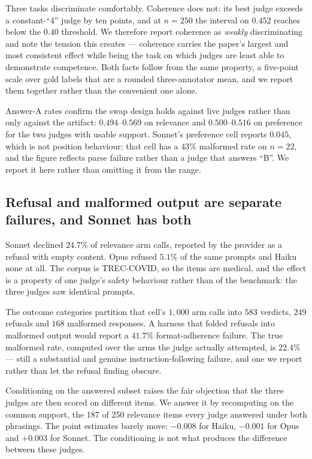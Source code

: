 \documentclass[11pt]{article}          %
\begin{document}
Three tasks discriminate comfortably. Coherence does not: its best judge exceeds
a constant-``4'' judge by ten points, and at $n=250$ the interval on $0.452$
reaches below the $0.40$ threshold. We therefore report coherence as
\emph{weakly} discriminating and note the tension this creates --- coherence
carries the paper's largest and most consistent effect while being the task on
which judges are least able to demonstrate competence. Both facts follow from
the same property, a five-point scale over gold labels that are a rounded
three-annotator mean, and we report them together rather than the convenient one
alone.

Answer-A rates confirm the swap design holds against live judges rather than only
against the artifact: $0.494$--$0.569$ on relevance and $0.500$--$0.516$ on
preference for the two judges with usable support. Sonnet's preference cell
reports $0.045$, which is not position behaviour: that cell has a $43\%$
malformed rate on $n=22$, and the figure reflects parse failure rather than a
judge that answers ``B''. We report it here rather than omitting it from the
range.

\subsection{Refusal and malformed output are separate failures, and Sonnet has both}
\label{sec:results-refusal}

Sonnet declined $24.7\%$ of relevance arm calls, reported by the provider as a
refusal with empty content. Opus refused $5.1\%$ of the same prompts and Haiku
none at all. The corpus is TREC-COVID, so the items are medical, and the effect
is a property of one judge's safety behaviour rather than of the benchmark: the
three judges saw identical prompts.

The outcome categories partition that cell's $1{,}000$ arm calls into $583$
verdicts, $249$ refusals and $168$ malformed responses. A harness that folded
refusals into malformed output would report a $41.7\%$ format-adherence failure.
The true malformed rate, computed over the arms the judge actually attempted, is
$22.4\%$ --- still a substantial and genuine instruction-following failure, and
one we report rather than let the refusal finding obscure.

Conditioning on the answered subset raises the fair objection that the three
judges are then scored on different items. We answer it by recomputing on the
common support, the 187 of 250 relevance items every judge answered under both
phrasings. The point estimates barely move: $-0.008$ for Haiku, $-0.001$ for
Opus and $+0.003$ for Sonnet. The conditioning is not what produces the
difference between these judges.
\end{document}
